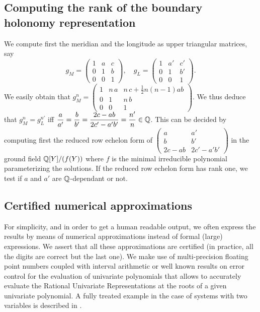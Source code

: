 \subsection{Computing the rank of the boundary holonomy representation}
We compute first the meridian and the longitude as upper triangular matrices,
 say
$$g_M =
\left(
\begin{matrix}
1 & a & c\\
0 & 1 & b \\
0 & 0 & 1
\end{matrix} \right ), \quad
g_L =
\left(
\begin{matrix}
1 & a' & c'\\
0 & 1 & b' \\
0 & 0 & 1
\end{matrix} \right )
.$$
We easily obtain that $g_M^n =
\left(
\begin{matrix}
1 & n\,a & n\, c + \frac 12 n(n-1)ab\\
0 & 1 & n\, b \\
0 & 0 & 1
\end{matrix} \right )$.
We thus deduce that $g_M^n = g_L^{n'}$ iff $\Frac{a}{a'} = \Frac{b}{b'} = \Frac{2c - ab}{2c'-a'b'} = \Frac{n'}{n} \in \Q$.
This can be decided by computing first the reduced row echelon form  of $
\left ( \begin{matrix}
a & a' \\
b & b '\\
2c-ab &2c'-a'b'
\end{matrix} \right )
$
in the ground field $\mathbb{Q}[Y]/(f(Y))$ where $f$ is the minimal irreducible polynomial parameterizing the solutions.
If the reduced row echelon form has rank one, we test if $a$ and $a'$ are $\mathbb{Q}$-dependant or not.

\subsection{Certified numerical approximations}

For simplicity, and in order to get a human readable output, we often express the results by means of numerical approximations instead of formal (large) expressions. We assert that all these approximations are certified (in practice, all the digits are correct but the last one). We make use of multi-precision floating point numbers coupled with interval arithmetic or well known results on error control for the evaluation of univariate polynomials  that allows to accurately evaluate the Rational Univariate Representations at the roots of a given univariate polynomial. A fully treated example in the case of systems with two variables  is described in \cite{bouzidi:hal-00802698}.
